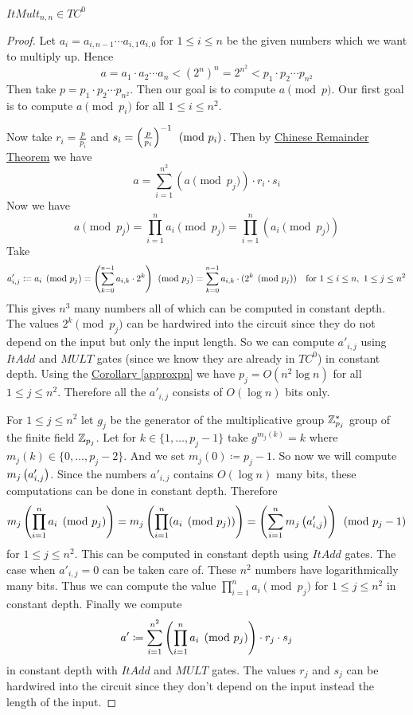 \begin{theorem}
	$ItMult_{n,n}\in TC^0$
\end{theorem}
\begin{proof}
	Let $a_i=a_{i,n-1}\cdots a_{i,1}a_{i,0}$ for $1\leq i\leq n$ be the given numbers which we want to multiply up. Hence $$a=a_1\cdot a_2\cdots a_n<  (2^n)^n=2^{n^2}<p_1\cdot p_2\cdots p_{n^2}$$Then take $p=p_1\cdot p_2\cdots p_{n^2}$. Then our goal is to compute $a\pmod{p}$. Our first goal is to compute $a\pmod{p_i}$ for all $1\leq i\leq n^2$. 
	
	Now take $r_i=\frac{p}{p_i}$ and $s_i=\left(\frac{p}{p_i}\right)^{-1}\pmod{p_i}$. Then by \hyperref[crt]{Chinese Remainder Theorem} we have $$a=\sum_{i=1}^{n^2}(a\pmod{p_j}) \cdot r_i\cdot s_i$$ Now we have $$a\pmod{p_j}=\prod_{i=1}^na_i\pmod{p_j}=\prod_{i=1}^n (a_i\pmod{p_j})$$Take $$a'_{i,j}\coloneqq a_i\pmod{p_j}=\left(\sum_{k=0}^{n-1}a_{i,k}\cdot  2^k\right)\pmod{p_j}= \sum_{k=0}^{n-1}a_{i,k}\cdot  (2^k\pmod{p_j})\quad\text{for }1\leq i\leq n,\ 1\leq j\leq n^2$$This gives $n^3$ many numbers all of which can be computed in constant depth. The values $2^k\pmod{p_j}$ can be hardwired into the circuit since they do not depend on the input but only the input length. So we can compute $a'_{i,j}$ using $ItAdd$ and $MULT$ gates (since we know they are already in $TC^0$) in constant depth. Using the \hyperref[approxpn]{Corollary \ref{approxpn}} we have $p_j=O(n^2\log n)$ for all $1\leq j\leq n^2$. Therefore all the $a'_{i,j}$ consists of $O(\log n)$ bits only.
	
	For $1\leq j\leq n^2$ let $g_j$ be the generator of the multiplicative group $\mathbb{Z}^*_{p_j}$ group of the finite field $\mathbb{Z}_{p_j}$. Let for $k\in \{1,\dots, p_j-1\}$ take $g^{m_j(k)}=k$ where $m_j(k)\in \{0,\dots, p_j-2\}$. And we set $m_j(0)\coloneqq p_j-1$. So now we will compute $m_j\left(a'_{i,j}\right)$. Since the numbers $a'_{i,j}$ contains $O(\log n)$ many bits, these computations can be done in constant depth. Therefore $$m_j\left( \prod_{i=1}^{n}a_i \pmod{p_j} \right)=m_j\left( \prod_{i=1}^{n}(a_i \pmod{p_j}) \right)=\left( \sum_{i=1}^n m_j\left(a'_{i,j}\right) \right)\pmod{p_j-1}$$ for $1\leq j\leq n^2$. This can be computed in constant depth using $ItAdd$ gates. The case when $a'_{i,j}=0$ can be taken care of. These $n^2$ numbers have logarithmically many bits. Thus we can compute the value $\prod\limits_{i=1}^n a_i\pmod{p_j}$ for $1\leq j\leq n^2$ in constant depth. Finally we compute $$a'\coloneqq \sum_{i=1}^{n^2}\left( \prod\limits_{i=1}^n a_i\pmod{p_j} \right)\cdot r_j\cdot s_j$$ in constant depth with $ItAdd$ and $MULT$ gates. The values $r_j$ and $s_j$ can be hardwired into the circuit since they don't depend on the input instead the length of the input.
	

\end{proof}
